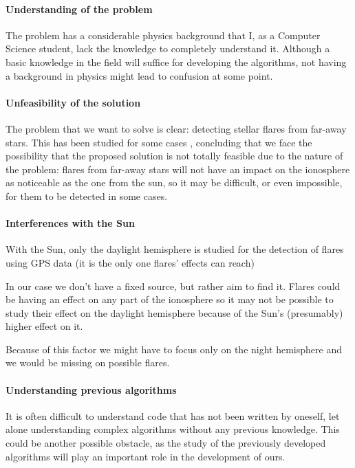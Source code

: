 \paragraph{Understanding of the problem}

The problem has a considerable physics background that I, as a Computer Science student, lack the knowledge to completely understand it. Although a basic knowledge in the field will suffice for developing the algorithms, not having a background in physics might lead to confusion at some point.

\paragraph{Unfeasibility of the solution}

The problem that we want to solve is clear: detecting stellar flares from far-away stars. This has been studied for some cases \cite{martinez2016first}, concluding that we face the possibility that the proposed solution is not totally feasible due to the nature of the problem: flares from far-away stars will not have an impact on the ionosphere as noticeable as the one from the sun, so it may be difficult, or even impossible, for them to be detected in some cases.

\paragraph{Interferences with the Sun}

With the Sun, only the daylight hemisphere is studied for the detection of flares using GPS data (it is the only one flares' effects can reach)

In our case we don’t have a fixed source, but rather aim to find it. Flares could be having an effect on any part of the ionosphere so it may not be possible to study their effect on the daylight hemisphere because of the Sun’s (presumably) higher effect on it. 

Because of this factor we might have to focus only on the night hemisphere and we would be missing on possible flares.

\paragraph{Understanding previous algorithms}

It is often difficult to understand code that has not been written by oneself, let alone understanding complex algorithms without any previous knowledge. This could be another possible obstacle, as the study of the previously developed algorithms will play an important role in the development of ours.

